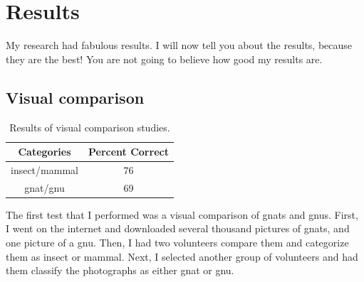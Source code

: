\documentclass[12pt]{thesis}
\begin{document}
\chapter{Results}
My research had fabulous results. I will now tell you about
the results, because they are the best!  You are not going
to believe how good my results are.

\section{Visual comparison}

\begin{table}
\caption{Results of visual comparison studies.}
\begin{center}
  \begin{tabular}{|c|c|}
    \hline
    \bf Categories & \bf Percent Correct\\
    \hline
    \hline
    insect/mammal & 76\\
    \hline
    gnat/gnu & 69\\
    \hline
  \end{tabular}
\end{center}
\label{table:comp1}
\end{table}

The first test that I performed was a visual comparison of gnats and
gnus.  First, I went on the internet and downloaded several thousand
pictures of gnats, and one picture of a gnu.  Then, I had two
volunteers compare them and categorize them as insect
or mammal.
Next, I selected another group of volunteers and
had them classify the photographs as either gnat or gnu.
\end{document}
